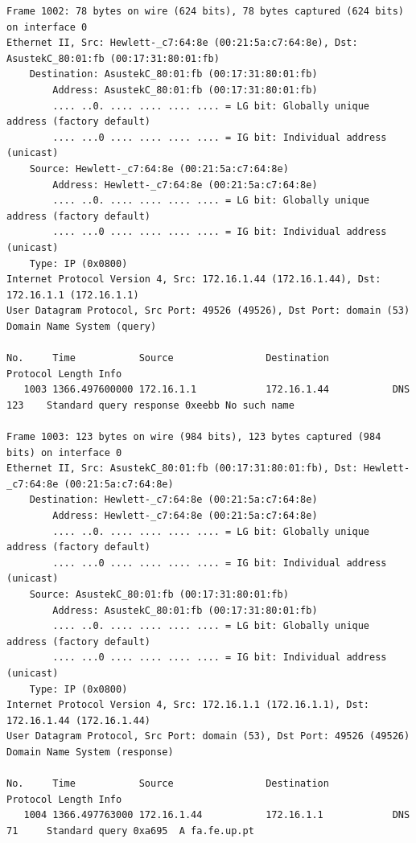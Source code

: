 \documentclass[a4paper,11pt]{article}
\begin{document}
\begin{lstlisting}
Frame 1002: 78 bytes on wire (624 bits), 78 bytes captured (624 bits) on interface 0
Ethernet II, Src: Hewlett-_c7:64:8e (00:21:5a:c7:64:8e), Dst: AsustekC_80:01:fb (00:17:31:80:01:fb)
    Destination: AsustekC_80:01:fb (00:17:31:80:01:fb)
        Address: AsustekC_80:01:fb (00:17:31:80:01:fb)
        .... ..0. .... .... .... .... = LG bit: Globally unique address (factory default)
        .... ...0 .... .... .... .... = IG bit: Individual address (unicast)
    Source: Hewlett-_c7:64:8e (00:21:5a:c7:64:8e)
        Address: Hewlett-_c7:64:8e (00:21:5a:c7:64:8e)
        .... ..0. .... .... .... .... = LG bit: Globally unique address (factory default)
        .... ...0 .... .... .... .... = IG bit: Individual address (unicast)
    Type: IP (0x0800)
Internet Protocol Version 4, Src: 172.16.1.44 (172.16.1.44), Dst: 172.16.1.1 (172.16.1.1)
User Datagram Protocol, Src Port: 49526 (49526), Dst Port: domain (53)
Domain Name System (query)

No.     Time           Source                Destination           Protocol Length Info
   1003 1366.497600000 172.16.1.1            172.16.1.44           DNS      123    Standard query response 0xeebb No such name

Frame 1003: 123 bytes on wire (984 bits), 123 bytes captured (984 bits) on interface 0
Ethernet II, Src: AsustekC_80:01:fb (00:17:31:80:01:fb), Dst: Hewlett-_c7:64:8e (00:21:5a:c7:64:8e)
    Destination: Hewlett-_c7:64:8e (00:21:5a:c7:64:8e)
        Address: Hewlett-_c7:64:8e (00:21:5a:c7:64:8e)
        .... ..0. .... .... .... .... = LG bit: Globally unique address (factory default)
        .... ...0 .... .... .... .... = IG bit: Individual address (unicast)
    Source: AsustekC_80:01:fb (00:17:31:80:01:fb)
        Address: AsustekC_80:01:fb (00:17:31:80:01:fb)
        .... ..0. .... .... .... .... = LG bit: Globally unique address (factory default)
        .... ...0 .... .... .... .... = IG bit: Individual address (unicast)
    Type: IP (0x0800)
Internet Protocol Version 4, Src: 172.16.1.1 (172.16.1.1), Dst: 172.16.1.44 (172.16.1.44)
User Datagram Protocol, Src Port: domain (53), Dst Port: 49526 (49526)
Domain Name System (response)

No.     Time           Source                Destination           Protocol Length Info
   1004 1366.497763000 172.16.1.44           172.16.1.1            DNS      71     Standard query 0xa695  A fa.fe.up.pt


\end{lstlisting}
\end{document}
